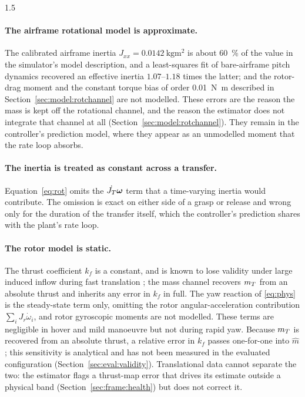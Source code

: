 \begin{spacing}{1.5}
\paragraph{The airframe rotational model is approximate.} The calibrated
airframe inertia $J_{xx}=\SI{0.0142}{\kg\meter\squared}$ is about
\SI{60}{\percent} of the value in the simulator's model description, and a
least-squares fit of bare-airframe pitch dynamics recovered an effective inertia
$1.07$--$1.18$ times the latter; and the rotor-drag moment and the constant
torque bias of order \SI{0.01}{\newton\meter} described in
Section~\ref{sec:model:rotchannel} are not modelled. These errors are the
reason the mass is kept off the rotational channel, and the reason the
estimator does not integrate that channel at all
(Section~\ref{sec:model:rotchannel}). They remain in the controller's prediction
model, where they appear as an unmodelled moment that the rate loop absorbs.

\paragraph{The inertia is treated as constant across a transfer.}
Equation~\eqref{eq:rot} omits the $\dot{J_T}\bm{\omega}$ term that a
time-varying inertia would contribute. The omission is exact on either side of a
grasp or release and wrong only for the duration of the transfer itself, which
the controller's prediction shares with the plant's rate loop.

\paragraph{The rotor model is static.} The thrust coefficient $k_f$ is a
constant, and is known to lose validity under large induced inflow during fast
translation \cite{bangura2012}; the mass channel recovers $m_T$ from an absolute
thrust and inherits any error in $k_f$ in full. The yaw reaction of
\eqref{eq:phys} is the steady-state term only, omitting the rotor
angular-acceleration contribution $\sum_i J_r \dot\omega_i$, and rotor
gyroscopic moments are not modelled. These terms are negligible in hover and
mild manoeuvre but not during rapid yaw. Because $m_T$ is recovered from an
absolute thrust, a relative error in $k_f$ passes one-for-one into $\hat m$; this
sensitivity is analytical and has not been measured in the evaluated
configuration (Section~\ref{sec:eval:validity}). Translational data cannot
separate the two: the estimator flags a thrust-map error that drives
its estimate outside a physical band (Section~\ref{sec:frame:health}) but does
not correct it.


\end{spacing}
